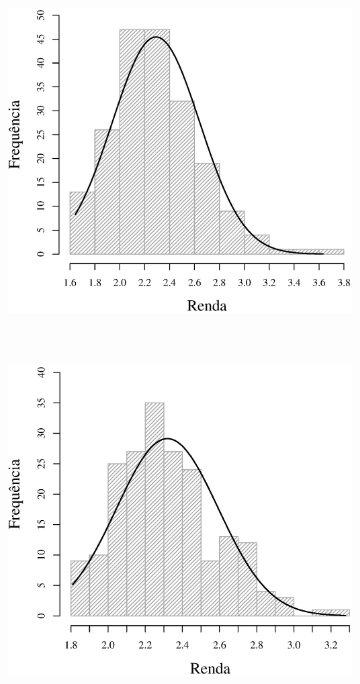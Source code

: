 \begin{figure}
\begin{subfigure}[b]{0.48\textwidth}
		\caption{}
		\label{fig:m8}
	\end{subfigure}
	\\
	\begin{subfigure}[b]{0.48\textwidth}
		\includegraphics[width=\textwidth]{plots/histogram_renda_n16.eps}
		\caption{}
		\label{fig:m16}
	\end{subfigure}
	~
	\begin{subfigure}[b]{0.48\textwidth}
		\includegraphics[width=\textwidth]{plots/histogram_renda_n30.eps}

\end{subfigure}
\end{figure}
